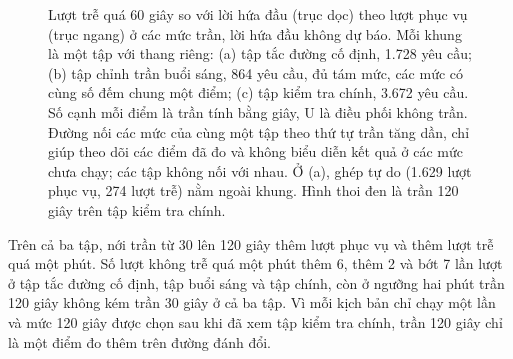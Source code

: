 \begin{figure}[htbp]
\caption[Lượt trễ theo lượt phục vụ ở các mức trần]{Lượt trễ quá 60 giây so với lời hứa đầu (trục dọc) theo lượt phục vụ (trục ngang) ở các mức
trần, lời hứa đầu không dự báo. Mỗi khung là một tập với thang riêng: (a) tập tắc đường cố định, 1.728
yêu cầu; (b) tập chỉnh trần buổi sáng, 864 yêu cầu, đủ tám mức, các mức có cùng số đếm chung một điểm; (c) tập
kiểm tra chính, 3.672 yêu cầu. Số cạnh mỗi điểm là trần tính bằng giây, U là điều phối không trần. Đường nối các mức
của cùng một tập theo thứ tự trần tăng dần, chỉ giúp theo dõi các điểm đã đo và không biểu diễn kết quả ở các mức
chưa chạy; các tập không nối với nhau. Ở (a), ghép tự do (1.629 lượt phục vụ, 274 lượt trễ) nằm ngoài khung. Hình
thoi đen là trần 120 giây trên tập kiểm tra chính.}
\label{hinh:c4-tran}
\end{figure}

Trên cả ba tập, nới trần từ 30 lên 120 giây thêm lượt phục vụ và thêm lượt trễ quá một phút. Số lượt không trễ quá một
phút thêm 6, thêm 2 và bớt 7 lần lượt ở tập tắc đường cố định, tập buổi sáng và tập chính, còn ở ngưỡng hai phút trần
120 giây không kém trần 30 giây ở cả ba tập. Vì mỗi kịch bản chỉ chạy một lần và mức 120 giây được chọn sau khi đã xem
tập kiểm tra chính, trần 120 giây chỉ là một điểm đo thêm trên đường đánh đổi.

